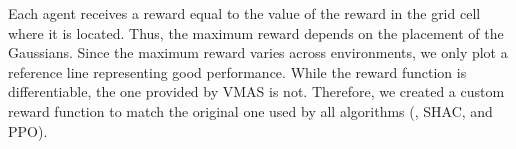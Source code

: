 Each agent receives a reward equal to the value of the reward in the grid cell where it is located. Thus, the maximum reward depends on the placement of the Gaussians. Since the maximum reward varies across environments, we only plot a reference line representing good performance. While the reward function is differentiable, the one provided by VMAS is not. Therefore, we created a custom reward function to match the original one used by all algorithms (\fname{}, SHAC, and PPO).




